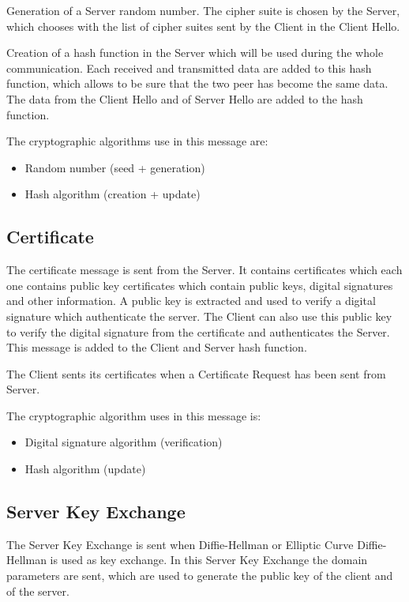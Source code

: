Generation of a Server random number.
The cipher suite is chosen by the Server, which chooses with the list of cipher
suites sent by the Client in the Client Hello.

Creation of a hash function in the Server which will be used during the whole
communication.
Each received and transmitted data are added to this hash function, which allows
to be sure that the two peer has become the same data. 
The data from the Client Hello and of Server Hello are added to the hash
function.

The cryptographic algorithms use in this message are:
\begin{itemize}[noitemsep]
  \item Random number (seed + generation)
  \item Hash algorithm (creation + update)
\end{itemize}

\subsection*{Certificate}
The certificate message is sent from the Server. It contains certificates which
each one contains public key certificates which contain public keys,
digital signatures and other information.
A public key is extracted and used to verify a digital signature which
authenticate the server.
The Client can also use this public key to verify the digital signature from
the certificate and authenticates the Server.
This message is added to the Client and Server hash function.

The Client sents its certificates when a Certificate Request has been sent from
Server.

The cryptographic algorithm uses in this message is:
\begin{itemize}[noitemsep]
  \item Digital signature algorithm (verification)
  \item Hash algorithm (update)
\end{itemize}

\subsection*{Server Key Exchange}
The Server Key Exchange is sent when Diffie-Hellman or Elliptic Curve
Diffie-Hellman  is used as key exchange.
In this Server Key Exchange the domain parameters are sent, which are used to
generate the public key of the client and of the server.

